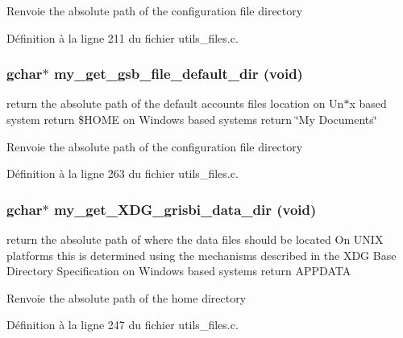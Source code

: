 \begin{DoxyReturn}{Renvoie}
the absolute path of the configuration file directory 
\end{DoxyReturn}


Définition à la ligne 211 du fichier utils\_\-files.c.

\subsubsection[{my\_\-get\_\-gsb\_\-file\_\-default\_\-dir}]{\setlength{\rightskip}{0pt plus 5cm}gchar$\ast$ my\_\-get\_\-gsb\_\-file\_\-default\_\-dir (void)}\label{utils__files_8h_ab0e498f3274063f20c4a6fb54b52271a}
return the absolute path of the default accounts files location on Un$\ast$x based system return \$HOME on Windows based systems return \char`\"{}My Documents\char`\"{}

\begin{DoxyReturn}{Renvoie}
the absolute path of the configuration file directory 
\end{DoxyReturn}


Définition à la ligne 263 du fichier utils\_\-files.c.

\subsubsection[{my\_\-get\_\-XDG\_\-grisbi\_\-data\_\-dir}]{\setlength{\rightskip}{0pt plus 5cm}gchar$\ast$ my\_\-get\_\-XDG\_\-grisbi\_\-data\_\-dir (void)}\label{utils__files_8h_a73d323b60da65cb56316d1a057fcd312}
return the absolute path of where the data files should be located On UNIX platforms this is determined using the mechanisms described in the XDG Base Directory Specification on Windows based systems return APPDATA

\begin{DoxyReturn}{Renvoie}
the absolute path of the home directory 
\end{DoxyReturn}


Définition à la ligne 247 du fichier utils\_\-files.c.

